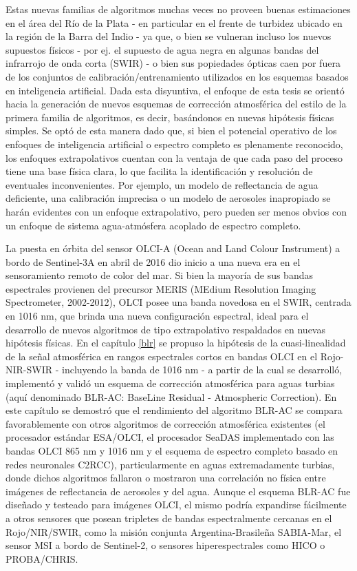 Estas nuevas familias de algoritmos muchas veces no proveen buenas estimaciones en el área del Río de la Plata - en particular en el frente de turbidez ubicado en la región de la Barra del Indio - ya que, o bien se vulneran incluso los nuevos supuestos físicos - por ej. el supuesto de agua negra en algunas bandas del infrarrojo de onda corta (SWIR) - o bien sus popiedades ópticas caen por fuera de los conjuntos de calibración/entrenamiento utilizados en los esquemas basados en inteligencia artificial.
%
Dada esta disyuntiva, el enfoque de esta tesis se orientó hacia la generación de nuevos esquemas de corrección atmosférica del estilo de la primera familia de algoritmos, es decir, basándonos en nuevas hipótesis físicas simples. Se optó de esta manera dado que, si bien el potencial operativo de los enfoques de inteligencia artificial o espectro completo es plenamente reconocido, los enfoques extrapolativos cuentan con la ventaja de que cada paso del proceso tiene una base física clara, lo que facilita la identificación y resolución de eventuales inconvenientes. Por ejemplo, un modelo de reflectancia de agua deficiente, una calibración imprecisa o un modelo de aerosoles inapropiado se harán evidentes con un enfoque extrapolativo, pero pueden ser menos obvios con un enfoque de sistema agua-atmósfera acoplado de espectro completo.

La puesta en órbita del sensor OLCI-A (Ocean and Land Colour Instrument) a bordo de Sentinel-3A en abril de 2016 dio inicio a una nueva era en el sensoramiento remoto de color del mar. Si bien la mayoría de sus bandas espectrales provienen del precursor MERIS (MEdium Resolution Imaging Spectrometer, 2002-2012), OLCI posee una banda novedosa en el SWIR, centrada en 1016 nm, que brinda una nueva configuración espectral, ideal para el desarrollo de nuevos algoritmos de tipo extrapolativo respaldados en nuevas hipótesis físicas. En el capítulo \ref{blr} se propuso la hipótesis de la cuasi-linealidad de la señal atmosférica en rangos espectrales cortos en bandas OLCI en el Rojo-NIR-SWIR - incluyendo la banda de 1016 nm - a partir de la cual se desarrolló, implementó y validó un esquema de corrección atmosférica para aguas turbias (aquí denominado BLR-AC: BaseLine Residual - Atmospheric Correction). En este capítulo se demostró que el rendimiento del algoritmo BLR-AC se compara favorablemente con otros algoritmos de corrección atmosférica existentes (el procesador estándar ESA/OLCI, el procesador SeaDAS implementado con las bandas OLCI 865 nm y 1016 nm y el esquema de espectro completo basado en redes neuronales C2RCC), particularmente en aguas extremadamente turbias, donde dichos algoritmos fallaron o mostraron una correlación no física entre imágenes de reflectancia de aerosoles y del agua. Aunque el esquema BLR-AC fue diseñado y testeado para imágenes OLCI, el mismo podría expandirse fácilmente a otros sensores que posean tripletes de bandas espectralmente cercanas en el Rojo/NIR/SWIR, como la misión conjunta Argentina-Brasileña SABIA-Mar, el sensor MSI a bordo de Sentinel-2, o sensores hiperespectrales como HICO o PROBA/CHRIS.

